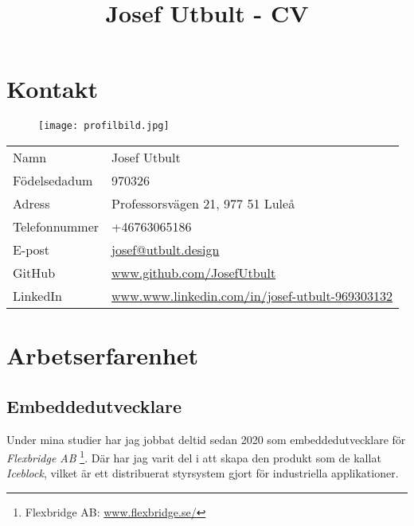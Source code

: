 \documentclass{article}
\title{Josef Utbult - CV}
\begin{document}
%
\maketitle
%
%
\section{Kontakt}
%
\begin{wrapfigure}[0]{r}{0.3\textwidth}
	\vspace*{-3cm}
    \centering
    \texttt{[image: profilbild.jpg]}
\end{wrapfigure}%
%
\begin{tabular}{P{0.17\textwidth} P{0.30\textwidth}}
%
	Namn 			& Josef Utbult 											\\
    Födelsedadum 	& 970326 												\\
    Adress 			& Professorsvägen 21, 977 51 Luleå 						\\
    Telefonnummer 	& +46763065186   										\\
    E-post 			& \url{josef@utbult.design}								\\
	GitHub			& \url{www.github.com/JosefUtbult}						\\
    LinkedIn        & \url{www.www.linkedin.com/in/josef-utbult-969303132} 	\\
%
\end{tabular}
%
\section{Arbetserfarenhet}

\subsection{Embeddedutvecklare}
Under mina studier har jag jobbat deltid sedan 2020 som embeddedutvecklare för \textit{Flexbridge AB}
\footnote{Flexbridge AB: \url{www.flexbridge.se/}}. 
Där har jag varit del i att skapa den produkt som de kallat \textit{Iceblock}, vilket är ett distribuerat styrsystem 
gjort för industriella applikationer.
\end{document}
